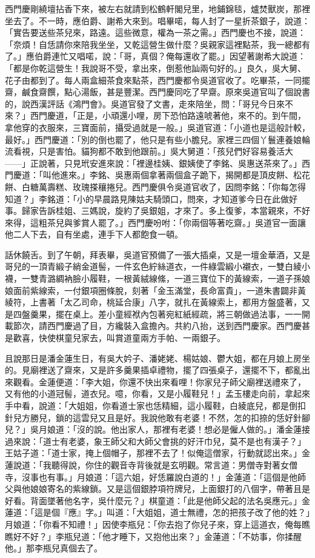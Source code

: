 西門慶剛繞壇拈香下來，被左右就請到松鶴軒閣兒里，地鋪錦毯，爐焚獸炭，那裡坐去了。不一時，應伯爵、謝希大來到。唱畢喏，每人封了一星折茶銀子，說道：「實告要送些茶兒來，路遠。這些微意，權為一茶之需。」西門慶也不接，說道：「奈煩！自恁請你來陪我坐坐，又乾這營生做什麼？吳親家這裡點茶，我一總都有了。」應伯爵連忙又唱喏，說：「哥，真個？俺每還收了罷。」因望著謝希大說道：「都是你乾這營生！我說哥不受，拿出來，倒惹他訕兩句好的。」良久，吳大舅、花子由都到了。每人兩盒細茶食來點茶，西門慶都令吳道官收了。吃畢茶，一同擺齋，鹹食齋饌，點心湯飯，甚是豐潔。西門慶同吃了早齋。原來吳道官叫了個說書的，說西漢評話《鴻門會》。吳道官發了文書，走來陪坐，問：「哥兒今日來不來？」西門慶道，「正是，小頑還小哩，房下恐怕路遠唬著他，來不的。到午間，拿他穿的衣服來，三寶面前，攝受過就是一般。」吳道官道：「小道也是這般計較，最好。」西門慶道：「別的倒也罷了，他只是有些小膽兒。家裡三四個丫鬟連養娘輪流看視，只是害怕。貓狗都不敢到他跟前。」吳大舅道：「孩兒們好容易養活大——」正說著，只見玳安進來說：「裡邊桂姨、銀姨使了李銘、吳惠送茶來了。」西門慶道：「叫他進來。」李銘、吳惠兩個拿著兩個盒子跪下，揭開都是頂皮餅、松花餅、白糖萬壽糕、玫瑰搽穰捲兒。西門慶俱令吳道官收了，因問李銘：「你每怎得知道？」李銘道：「小的早晨路見陳姑夫騎頭口，問來，才知道爹今日在此做好事。歸家告訴桂姐、三媽說，旋約了吳銀姐，才來了。多上復爹，本當親來，不好來得，這粗茶兒與爹賞人罷了。」西門慶吩咐：「你兩個等著吃齋。」吳道官一面讓他二人下去，自有坐處，連手下人都飽食一頓。

話休饒舌。到了午朝，拜表畢，吳道官預備了一張大插桌，又是一壇金華酒，又是哥兒的一頂青緞子綃金道髻，一件玄色紵絲道衣，一件綠雲緞小襯衣，一雙白綾小襪，一雙青潞綢衲臉小履鞋，一根黃絨線絛，一道三寶位下的黃線索，一道子孫娘娘面前紫線索，一付銀項圈條脫，刻著「金玉滿堂，長命富貴」，一道朱書闢非黃綾符，上書著「太乙司命，桃延合康」八字，就扎在黃線索上，都用方盤盛著，又是四盤羹果，擺在桌上。差小童經袱內包著宛紅紙經疏，將三朝做過法事，一一開載節次，請西門慶過了目，方纔裝入盒擔內。共約八抬，送到西門慶家。西門慶甚是歡喜，快使棋童兒家去，叫賞道童兩方手帕、一兩銀子。

且說那日是潘金蓮生日，有吳大妗子、潘姥姥、楊姑娘、鬱大姐，都在月娘上房坐的。見廟裡送了齋來，又是許多羹果插卓禮物，擺了四張桌子，還擺不下，都亂出來觀看。金蓮便道：「李大姐，你還不快出來看哩！你家兒子師父廟裡送禮來了，又有他的小道冠髻，道衣兒。噫，你看，又是小履鞋兒！」孟玉樓走向前，拿起來手中看，說道：「大姐姐，你看道士家也恁精細，這小履鞋，白綾底兒，都是倒扣針兒方勝兒，鎖的這雲兒又且是好。我說他敢有老婆！不然，怎的扣捺的恁好針腳兒？」吳月娘道：「沒的說。他出家人，那裡有老婆！想必是僱人做的。」潘金蓮接過來說：「道士有老婆，象王師父和大師父會挑的好汗巾兒，莫不是也有漢子？」王姑子道：「道士家，掩上個帽子，那裡不去了！似俺這僧家，行動就認出來。」金蓮說道：「我聽得說，你住的觀音寺背後就是玄明觀。常言道：男僧寺對著女僧寺，沒事也有事。」月娘道：「這六姐，好恁羅說白道的！」金蓮道：「這個是他師父與他娘娘寄名的紫線鎖。又是這個銀脖項符牌兒，上面銀打的八個字，帶著且是好看。背面墜著他名字，吳什麼元？」棋童道：「此是他師父起的法名吳應元。」金蓮道：「這是個『應』字。」叫道：「大姐姐，道士無禮，怎的把孩子改了他的姓？」月娘道：「你看不知禮！」因使李瓶兒：「你去抱了你兒子來，穿上這道衣，俺每瞧瞧好不好？」李瓶兒道：「他才睡下，又抱他出來？」金蓮道：「不妨事，你揉醒他。」那李瓶兒真個去了。

